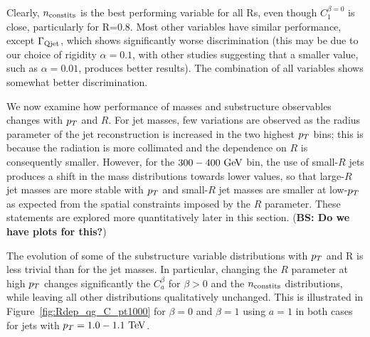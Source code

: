 %
Clearly, $n_{\rm constits}$ is the best performing variable for all Rs, even though $C_1^{\beta=0}$ is close, particularly
for R=0.8. Most other variables have similar performance, except $\Gamma_{\rm Qjet}$, which shows significantly worse
discrimination (this may be due to our choice of
rigidity $\alpha = 0.1$, with other studies suggesting that a smaller value,
such as $\alpha = 0.01$, produces better results). The combination of all variables shows somewhat better discrimination.

We now examine how performance of masses and substructure observables changes with $p_T$ and $R$. For jet masses, few variations are observed as the 
radius parameter of the jet reconstruction is increased in the two highest $p_T$ bins; this is because the radiation
is more collimated and the dependence on $R$ is consequently smaller.
However, for the $300-400\GeV$ bin, the use of small-$R$ jets produces a shift in the
mass distributions towards lower values, so that large-$R$ jet masses are more stable
with $p_T$ and small-$R$ jet masses are smaller at low-$p_T$ as expected from the spatial
constraints imposed by the $R$ parameter. These statements are explored more 
quantitatively later in this section. ({\bf BS: Do we have plots for this?})

The evolution of some of the substructure variable distributions with $p_T$ and R is less trivial than
 for the jet masses. In particular, changing the $R$ parameter at high $p_T$ changes significantly the $C_a^{\beta}$
for $\beta>0$ and the $n_{\rm constits}$ distributions, while leaving all other distributions qualitatively unchanged. 
This is illustrated in Figure~\ref{fig:Rdep_qg_C_pt1000} for $\beta=0$ and $\beta=1$ using $a=1$ in both cases for
jets with $\pt=1.0-1.1\TeV$. 

